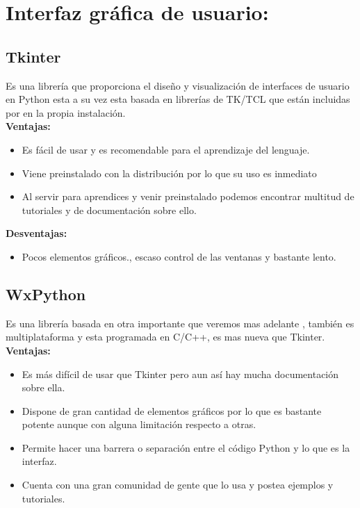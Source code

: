 
\section{Interfaz gráfica de usuario:}
\subsection{Tkinter}
Es una librería que proporciona el diseño y visualización de interfaces de usuario en Python esta a su vez esta basada en librerías de TK/TCL que están incluidas por en la propia instalación.
\\

\textbf{Ventajas:}

\begin{itemize}
\item Es fácil de usar y es recomendable para el aprendizaje del lenguaje.

\item Viene preinstalado con la distribución por lo que su uso es inmediato

\item Al servir para aprendices y venir preinstalado podemos encontrar multitud de tutoriales y de documentación sobre ello.
\end{itemize}

\textbf{Desventajas:}

\begin{itemize}
\item Pocos elementos gráficos., escaso control de las ventanas y bastante lento.
\end{itemize}

\subsection{WxPython}
Es una librería basada en otra importante que veremos mas adelante , también es multiplataforma y esta programada en C/C++, es mas nueva que Tkinter.
\\

\textbf{Ventajas:}

\begin{itemize}
\item Es más difícil de usar que Tkinter pero aun así hay mucha documentación sobre ella.

\item Dispone de gran cantidad de elementos gráficos por lo que es bastante potente aunque con alguna limitación respecto a otras.

\item Permite hacer una barrera o separación entre el código Python y lo que es la interfaz.
\item Cuenta con una gran comunidad de gente que lo usa y postea ejemplos y tutoriales.
\end{itemize}

